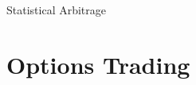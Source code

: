 \documentclass{beamer}
\begin{document}
\begin{frame}{Statistical Arbitrage}
\end{frame}

\section{Options Trading}

\end{document}
